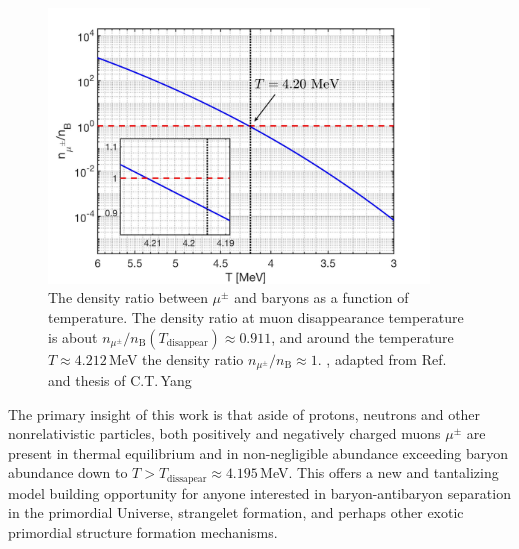 \begin{figure}
\centerline{\includegraphics[width=0.9\textwidth]{./plots/DensityRatio_new2.jpg}}
\caption{The density ratio between $\mu^\pm$ and baryons as a function of temperature. The density ratio at muon disappearance temperature is about $n_{\mu^\pm}/n_\mathrm{B}(T_\mathrm{disappear})\approx0.911$, and around the temperature $T\approx4.212$\,MeV the density ratio $n_{\mu^\pm}/n_\mathrm{B}\approx1$. , adapted from Ref.~\cite{Rafelski:2021aey} and thesis of C.T.\,Yang~\cite{Yang:2024ret}}
\label{fig:DensityRatio}
\end{figure}

The primary insight of this work is that aside of protons, neutrons and other nonrelativistic particles, both positively and negatively charged muons $\mu^\pm$ are present in thermal equilibrium and in non-negligible abundance exceeding baryon abundance down to  $T>T_\mathrm{dissapear}\approx 4.195$\,MeV. This offers a new and tantalizing model building opportunity for anyone interested in baryon-antibaryon separation in the primordial Universe, strangelet formation, and perhaps other exotic primordial structure formation mechanisms. 



